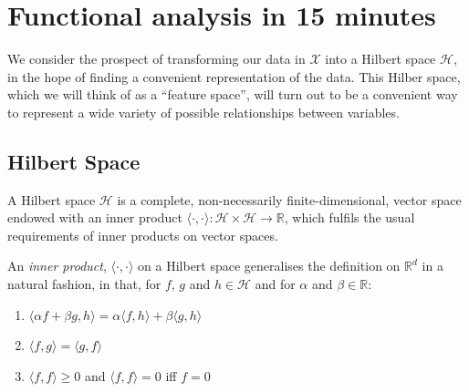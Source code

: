 \section{Functional analysis in 15 minutes}
We consider the prospect of transforming our data in $\mathcal{X}$ into a Hilbert space $\mathcal{H}$, in the hope of finding a convenient representation of the data. This Hilber space, which we will think of as a ``feature space'', will turn out to be a convenient way to represent a wide variety of possible relationships between variables.

\subsection{Hilbert Space}
\begin{defn}
A Hilbert space $\mathcal{H}$ is a complete, non-necessarily finite-dimensional, vector space endowed with an inner product $\langle\cdot,\cdot\rangle: \mathcal{H}\times\mathcal{H} \rightarrow\mathbb{R}$, which fulfils the usual requirements of inner products on vector spaces.
\end{defn}
\clearpage
\begin{defn}
An \emph{inner product}, $\langle\cdot,\cdot\rangle$ on a Hilbert space generalises the definition on $\mathbb{R}^d$ in a natural fashion, in that, for $f,\,g$ and $h \in \mathcal{H}$ and for $\alpha$ and $\beta \in \mathbb{R}$:
\begin{enumerate}
\item $\langle\alpha f + \beta g, h\rangle = \alpha\langle f, h\rangle + \beta\langle g, h\rangle$
\item $\langle f, g\rangle = \langle g, f \rangle$
\item $\langle f, f \rangle \ge 0$ and $\langle f, f\rangle = 0$ iff $f =0$
\end{enumerate}
\end{defn}

